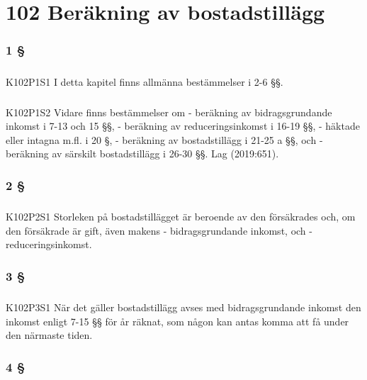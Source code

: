 \documentclass[a4paper,notitlepage,openany,10pt]{book}
\begin{document}
\chapter*{102 Beräkning av bostadstillägg}
\subsection*{1 §}
\paragraph*{}
{\tiny K102P1S1}
I detta kapitel finns allmänna bestämmelser i 2-6 §§.
\paragraph*{}
{\tiny K102P1S2}
Vidare finns bestämmelser om
\newline - beräkning av bidragsgrundande inkomst i 7-13 och 15 §§,
\newline - beräkning av reduceringsinkomst i 16-19 §§,
\newline - häktade eller intagna m.fl. i 20 §,
\newline - beräkning av bostadstillägg i 21-25 a §§, och
\newline - beräkning av särskilt bostadstillägg i 26-30 §§.
Lag (2019:651).
\subsection*{2 §}
\paragraph*{}
{\tiny K102P2S1}
Storleken på bostadstillägget är beroende av den försäkrades och, om den försäkrade är gift, även makens
\newline - bidragsgrundande inkomst, och
\newline - reduceringsinkomst.
\subsection*{3 §}
\paragraph*{}
{\tiny K102P3S1}
När det gäller bostadstillägg avses med bidragsgrundande inkomst den inkomst enligt 7-15 §§ för år räknat, som någon kan antas komma att få under den närmaste tiden.
\subsection*{4 §}
\end{document}
